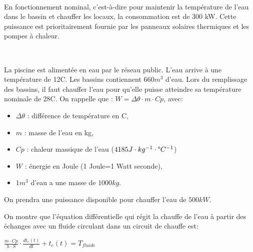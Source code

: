 
~\

En fonctionnement nominal, c'est-à-dire pour maintenir la température de l'eau dans le bassin et chauffer les locaux, la consommation est de 300 kW. Cette puissance est prioritairement fournie par les panneaux solaires thermiques et les pompes à chaleur.


~\

La piscine est alimentée en eau par le réseau public. L'eau arrive à une température de 12\textdegree C. Les bassins contiennent $660m^3$ d'eau.
Lors du remplissage des bassins, il faut chauffer l'eau pour qu'elle puisse atteindre sa température nominale de 28\textdegree C.
On rappelle que : $W = \Delta\theta\cdot m\cdot Cp$, avec:
\begin{itemize}
 \item $\Delta\theta$ : différence de température en \textdegree C,
 \item $m$ : masse de l'eau en kg,
 \item $Cp$ : chaleur massique de l'eau ($4185J\cdot kg^{-1}\cdot\degree C^{-1}$)
 \item $W$ : énergie en Joule (1 Joule=1 Watt seconde),
 \item $1m^3$ d'eau a une masse de $1000 kg$.
\end{itemize}


On prendra une puissance disponible pour chauffer l'eau de $500 kW$.


\newpage

On montre que l'équation différentielle qui régit la chauffe de l'eau à partir des échanges avec un fluide circulant dans un circuit de chauffe est:

\begin{center}
$\frac{m\cdot Cp}{h\cdot S}\cdot\frac{dt_e(t)}{dt}+t_e(t)=T_{fluide}$
\end{center}

